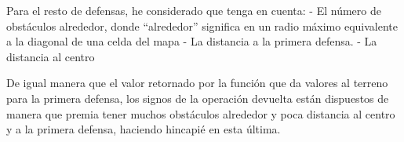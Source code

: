 Para el resto de defensas, he considerado que tenga en cuenta:
- El número de obstáculos alrededor, donde ``alrededor'' significa en un radio máximo equivalente a la diagonal de una celda del mapa
- La distancia a la primera defensa.
- La distancia al centro

De igual manera que el valor retornado por la función que da valores al terreno para la primera defensa, los signos de la operación devuelta están dispuestos de manera que premia tener muchos obstáculos alrededor y poca distancia al centro y a la primera defensa, haciendo hincapié en esta última.
